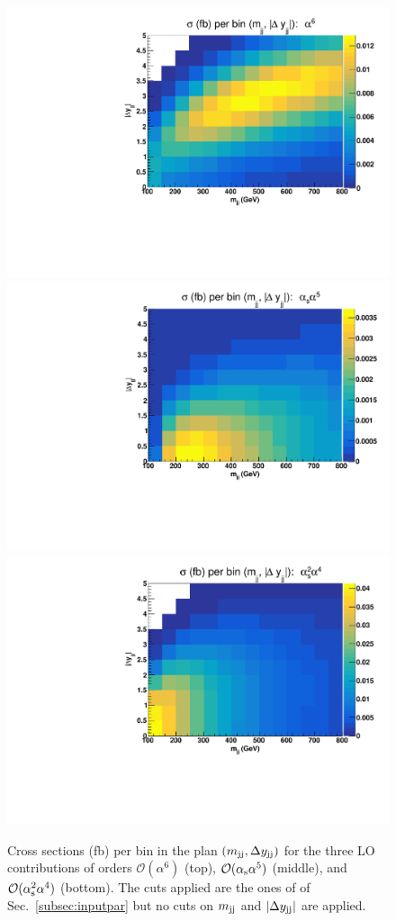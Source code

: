 \begin{figure}[hbt]
\centering
\includegraphics[scale=0.395]{figures/scanfigures/scan_ew6.pdf}
\includegraphics[scale=0.395]{figures/scanfigures/scan_ew5qcd1.pdf}
\includegraphics[scale=0.395]{figures/scanfigures/scan_ew4qcd2.pdf}
\caption{Cross sections (fb) per bin in the plan $\left(m_{\text{j}\text{j}}, \Delta y_{\text{j}\text{j}}\right)$ for the three LO contributions of orders $\mathcal{O}(\alpha^6)$ (top), $\mathcal{O}(\alpha_\text{s}\alpha^5)$ (middle), and $\mathcal{O}(\alpha_\text{s}^2 \alpha^4)$ (bottom).
The cuts applied are the ones of of Sec.~\ref{subsec:inputpar} but no cuts on $m_{\text{j}\text{j}}$ and $|\Delta y_{\text{j}\text{j}}|$ are applied.
}
\label{fig:mjjdyjj_2d_LO}
\end{figure}
